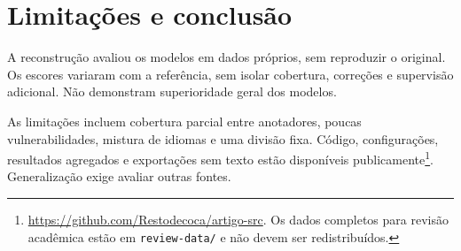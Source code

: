 \section{Limitações e conclusão}
\label{sec:conc}

A reconstrução avaliou os modelos em dados próprios, sem reproduzir o original. Os escores variaram com a referência, sem isolar cobertura, correções e supervisão adicional. Não demonstram superioridade geral dos modelos.

As limitações incluem cobertura parcial entre anotadores, poucas vulnerabilidades, mistura de idiomas e uma divisão fixa. Código, configurações, resultados agregados e exportações sem texto estão disponíveis publicamente\footnote{\url{https://github.com/Restodecoca/artigo-src}. Os dados completos para revisão acadêmica estão em \texttt{review-data/} e não devem ser redistribuídos.}. Generalização exige avaliar outras fontes.
